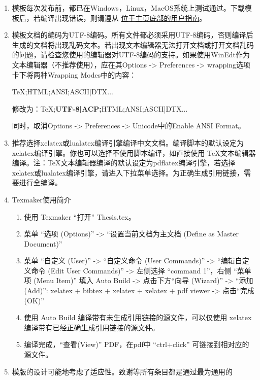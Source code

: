 \begin{enumerate}
    \item 模板每次发布前，都已在Windows，Linux，MacOS系统上测试通过。下载模板后，若编译出现错误，则请遵从 \href{https://github.com/mohuangrui/ucasthesis}{位于主页底部的用户指南}。

    \item 模板文档的编码为UTF-8编码。所有文件都必须采用UTF-8编码，否则编译后生成的文档将出现乱码文本。若出现文本编辑器无法打开文档或打开文档乱码的问题，请检查您使用的编辑器对UTF-8编码的支持。如果使用WinEdt作为文本编辑器（不推荐使用），应在其Options -> Preferences -> wrapping选项卡下将两种Wrapping Modes中的内容：
        
        TeX;HTML;ANSI;ASCII|DTX...
        
        修改为：TeX;\textbf{UTF-8|ACP;}HTML;ANSI;ASCII|DTX...
        
        同时，取消Options -> Preferences -> Unicode中的Enable ANSI Format。

    \item 推荐选择xelatex或lualatex编译引擎编译中文文档。编译脚本的默认设定为xelatex编译引擎。你也可以选择不使用脚本编译，如直接使用 \TeX{}文本编辑器编译。注：\TeX{}文本编辑器编译的默认设定为pdflatex编译引擎，若选择xelatex或lualatex编译引擎，请进入下拉菜单选择。为正确生成引用链接，需要进行全编译。
    \item Texmaker使用简介
        \begin{enumerate}
            \footnotesize
            \item 使用 Texmaker “打开” Thesis.tex。
            \item 菜单 “选项 (Options)” -> “设置当前文档为主文档 (Define as Master Document)”
            \item 菜单 “自定义 (User)” -> “自定义命令 (User Commands)” -> “编辑自定义命令 (Edit User Commands)” -> 左侧选择 “command 1”，右侧 “菜单项 (Menu Item)” 填入 Auto Build -> 点击下方“向导 (Wizard)” -> “添加 (Add)”: xelatex + bibtex + xelatex + xelatex + pdf viewer -> 点击“完成 (OK)”
            \item 使用 Auto Build 编译带有未生成引用链接的源文件，可以仅使用 xelatex 编译带有已经正确生成引用链接的源文件。
            \item 编译完成，“查看(View)” PDF，在pdf中 “ctrl+click” 可链接到相对应的源文件。
        \end{enumerate}
    
    \item 模版的设计可能地考虑了适应性。致谢等所有条目都是通过最为通用的


\end{enumerate}
